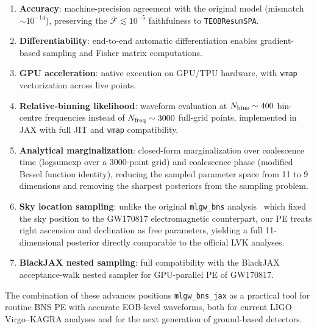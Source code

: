 \documentclass[twocolumn,superscriptaddress,nofootinbib,aps,prd]{revtex4-2}
\begin{document}
\begin{enumerate}
    \item \textbf{Accuracy}: machine-precision agreement with the original
          model (mismatch $\sim\!10^{-14}$), preserving the
          $\bar{\mathcal{F}} \lesssim 10^{-5}$ faithfulness to
          \texttt{TEOBResumSPA}.

    \item \textbf{Differentiability}: end-to-end automatic differentiation
          enables gradient-based sampling and Fisher matrix computations.

    \item \textbf{GPU acceleration}: native execution on GPU/TPU hardware,
          with \texttt{vmap} vectorization across live points.

    \item \textbf{Relative-binning likelihood}: waveform evaluation at
          $N_{\rm bins} \sim 400$ bin-centre frequencies instead of
          $N_{\rm freq} \sim 3000$ full-grid points, implemented in JAX
          with full JIT and \texttt{vmap} compatibility.

    \item \textbf{Analytical marginalization}: closed-form marginalization
          over coalescence time (logsumexp over a 3000-point grid) and
          coalescence phase (modified Bessel function identity), reducing
          the sampled parameter space from 11 to 9 dimensions and removing
          the sharpest posteriors from the sampling problem.

    \item \textbf{Sky location sampling}: unlike the original
          \texttt{mlgw\_bns} analysis~\cite{Tissino:2022} which fixed the
          sky position to the GW170817 electromagnetic counterpart, our PE
          treats right ascension and declination as free parameters,
          yielding a full 11-dimensional posterior directly comparable to
          the official LVK analyses.

    \item \textbf{BlackJAX nested sampling}: full compatibility with the
          BlackJAX acceptance-walk nested sampler for GPU-parallel PE of
          GW170817.
\end{enumerate}

The combination of these advances positions \texttt{mlgw\_bns\_jax} as a
practical tool for routine BNS PE with accurate EOB-level waveforms,
both for current LIGO--Virgo--KAGRA analyses and for the next generation of
ground-based detectors.
\end{document}
